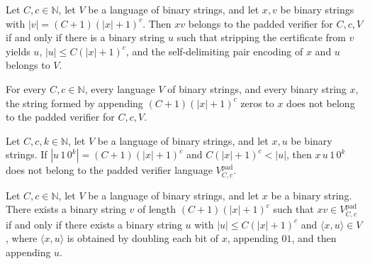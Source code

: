 \begin{lemma}
\label{Complexity.paddedVerifier_append}
\leanok
{}
Let $C,c\in\mathbb{N}$, let $V$ be a language of binary strings, and let $x,v$ be binary
strings with $|v|=(C+1)(|x|+1)^c$. Then $xv$ belongs to the padded verifier for $C,c,V$
if and only if there is a binary string $u$ such that stripping the certificate from $v$
yields $u$, $|u|\le C(|x|+1)^c$, and the self-delimiting pair encoding of $x$ and $u$
belongs to $V$.
\end{lemma}

\begin{lemma}
\label{Complexity.paddedVerifier_no_marker}
\leanok
{}
For every $C,c\in\mathbb{N}$, every language $V$ of binary strings, and every binary
string $x$, the string formed by appending $(C+1)(|x|+1)^c$ zeros to $x$ does not belong
to the padded verifier for $C,c,V$.
\end{lemma}

\begin{lemma}
\label{Complexity.paddedVerifier_too_long}
\leanok
{}
Let $C,c,k\in\mathbb{N}$, let $V$ be a language of binary strings, and let $x,u$ be
binary strings. If $|u\,1\,0^k|=(C+1)(|x|+1)^c$ and $C(|x|+1)^c<|u|$, then
$x\,u\,1\,0^k$ does not belong to the padded verifier language $V^{\mathrm{pad}}_{C,c}$.
\end{lemma}

\begin{lemma}
\label{Complexity.paddedVerifier_witness}
\leanok
{}
Let $C,c\in\mathbb{N}$, let $V$ be a language of binary strings, and let $x$ be a binary
string. There exists a binary string $v$ of length $(C+1)(|x|+1)^c$ such that $xv\in
V^{\mathrm{pad}}_{C,c}$ if and only if there exists a binary string $u$ with $|u|\le
C(|x|+1)^c$ and $\langle x,u\rangle\in V$, where $\langle x,u\rangle$ is obtained by
doubling each bit of $x$, appending $01$, and then appending $u$.
\end{lemma}

